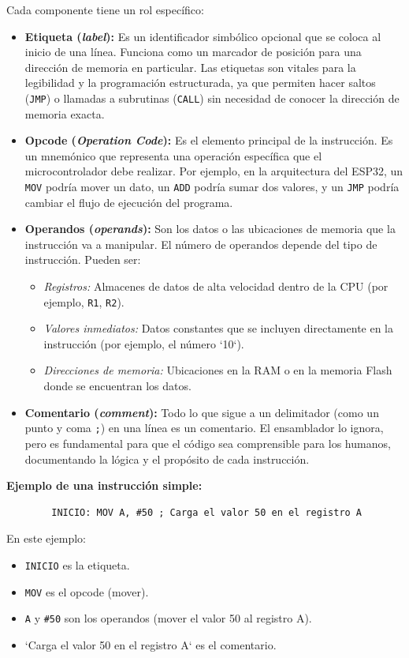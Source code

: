 \documentclass[a4paper,12pt]{article}
\begin{document}
	Cada componente tiene un rol específico:
	\begin{itemize}
		\item \textbf{Etiqueta (\textit{label}):} Es un identificador simbólico opcional que se coloca al inicio de una línea. Funciona como un marcador de posición para una dirección de memoria en particular. Las etiquetas son vitales para la legibilidad y la programación estructurada, ya que permiten hacer saltos (\texttt{JMP}) o llamadas a subrutinas (\texttt{CALL}) sin necesidad de conocer la dirección de memoria exacta.
		\item \textbf{Opcode (\textit{Operation Code}):} Es el elemento principal de la instrucción. Es un mnemónico que representa una operación específica que el microcontrolador debe realizar. Por ejemplo, en la arquitectura del ESP32, un \texttt{MOV} podría mover un dato, un \texttt{ADD} podría sumar dos valores, y un \texttt{JMP} podría cambiar el flujo de ejecución del programa.
		\item \textbf{Operandos (\textit{operands}):} Son los datos o las ubicaciones de memoria que la instrucción va a manipular. El número de operandos depende del tipo de instrucción. Pueden ser:
		\begin{itemize}
			\item \textit{Registros:} Almacenes de datos de alta velocidad dentro de la CPU (por ejemplo, \texttt{R1}, \texttt{R2}).
			\item \textit{Valores inmediatos:} Datos constantes que se incluyen directamente en la instrucción (por ejemplo, el número `10`).
			\item \textit{Direcciones de memoria:} Ubicaciones en la RAM o en la memoria Flash donde se encuentran los datos.
		\end{itemize}
		\item \textbf{Comentario (\textit{comment}):} Todo lo que sigue a un delimitador (como un punto y coma \texttt{;}) en una línea es un comentario. El ensamblador lo ignora, pero es fundamental para que el código sea comprensible para los humanos, documentando la lógica y el propósito de cada instrucción.
	\end{itemize}
	
	\vspace{0.5cm}
	
	\textbf{Ejemplo de una instrucción simple:}
	\begin{verbatim}
		INICIO: MOV A, #50 ; Carga el valor 50 en el registro A
	\end{verbatim}
	En este ejemplo:
	\begin{itemize}
		\item \texttt{INICIO} es la etiqueta.
		\item \texttt{MOV} es el opcode (mover).
		\item \texttt{A} y \texttt{\#50} son los operandos (mover el valor 50 al registro A).
		\item `Carga el valor 50 en el registro A` es el comentario.
	\end{itemize}
\end{document}
